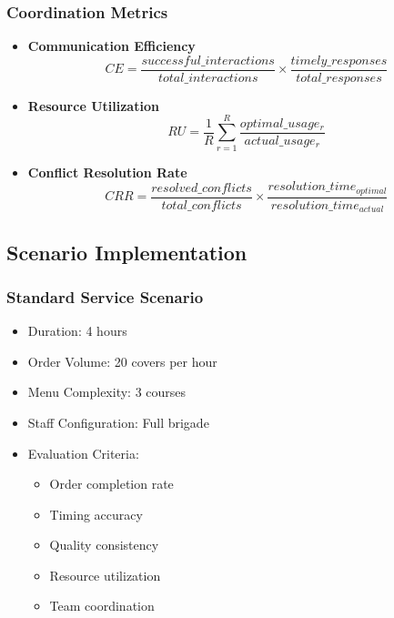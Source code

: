 \documentclass{article}
\begin{document}
\subsubsection{Coordination Metrics}
\begin{itemize}
    \item \textbf{Communication Efficiency}
    \begin{equation}
        CE = \frac{successful\_interactions}{total\_interactions} \times \frac{timely\_responses}{total\_responses}
    \end{equation}
    
    \item \textbf{Resource Utilization}
    \begin{equation}
        RU = \frac{1}{R}\sum_{r=1}^{R} \frac{optimal\_usage_r}{actual\_usage_r}
    \end{equation}
    
    \item \textbf{Conflict Resolution Rate}
    \begin{equation}
        CRR = \frac{resolved\_conflicts}{total\_conflicts} \times \frac{resolution\_time_{optimal}}{resolution\_time_{actual}}
    \end{equation}
\end{itemize}

\subsection{Scenario Implementation}

\subsubsection{Standard Service Scenario}
\begin{itemize}
    \item Duration: 4 hours
    \item Order Volume: 20 covers per hour
    \item Menu Complexity: 3 courses
    \item Staff Configuration: Full brigade
    \item Evaluation Criteria:
    \begin{itemize}
        \item Order completion rate
        \item Timing accuracy
        \item Quality consistency
        \item Resource utilization
        \item Team coordination
    \end{itemize}
\end{itemize}
\end{document}
